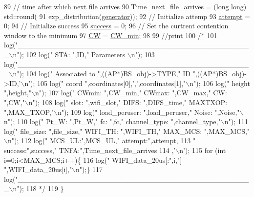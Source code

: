 \begin{DoxyCode}
89     \textcolor{comment}{// time after which next file arrives}
90     \hyperlink{classSTA_ad7653686912b61e311486017049c3612}{Time\_next\_file\_arrives} = (\textcolor{keywordtype}{long} long) std::round(
91             exp\_distribution(\hyperlink{classSTA_a6abca7e07713d8123e843efea3c87cd1}{generator}));
92     \textcolor{comment}{// Initialize attemp}
93     \hyperlink{classSTA_a4cfeac60ce7a13a4bbae68b756655dc9}{attempt} = 0;
94     \textcolor{comment}{// Initialize success}
95     \hyperlink{classSTA_a8f2d6be8326b3e46fbf1599040bff750}{success} = 0;
96     \textcolor{comment}{// Set the curtrent contention window to the minimum}
97     \hyperlink{classSTA_add0683c8927abd74b422d88844a00602}{CW} = \hyperlink{classSTA_ab466517298fbdaa0efd8532646930dfd}{CW\_min};
98     
99     \textcolor{comment}{//print}
100     \textcolor{comment}{/*}
101 \textcolor{comment}{    log("\_\_\_\_\_\_\_\_\_\_\_\_\_\_\_\_\_\_\_\_\_\_\_\_\_\_\_\_\_\_\_\_\_\_\_\_\_\_\_\_\_\_\_\_\_\_\(\backslash\)n");}
102 \textcolor{comment}{    log(" STA: ",ID," Parameters \(\backslash\)n");}
103 \textcolor{comment}{    log("\_\_\_\_\_\_\_\_\_\_\_\_\_\_\_\_\_\_\_\_\_\_\_\_\_\_\_\_\_\_\_\_\_\_\_\_\_\_\_\_\_\_\_\_\_\_\(\backslash\)n");}
104 \textcolor{comment}{    log(" Associated to ",((AP*)BS\_obj)->TYPE," ID ",((AP*)BS\_obj)->ID,'\(\backslash\)n');}
105 \textcolor{comment}{    log(" coord ",coordinates[0],',',coordinates[1],"\(\backslash\)n");}
106 \textcolor{comment}{    log(" height ",height,"\(\backslash\)n");}
107 \textcolor{comment}{    log(" CWmin: ",CW\_min," CWmax: ",CW\_max," CW: ",CW,"\(\backslash\)n");}
108 \textcolor{comment}{    log(" slot: ",wifi\_slot," DIFS: ",DIFS\_time," MAXTXOP: ",MAX\_TXOP,"\(\backslash\)n");}
109 \textcolor{comment}{    log(" load\_peruser: ",load\_peruser," Noise: ",Noise,"\(\backslash\)n");}
110 \textcolor{comment}{    log(" Pt\_W: ",Pt\_W," fc: ",fc," channel\_type: ",channel\_type,"\(\backslash\)n");}
111 \textcolor{comment}{    log(" file\_size: ",file\_size," WIFI\_TH: ",WIFI\_TH," MAX\_MCS: ",MAX\_MCS,"\(\backslash\)n");}
112 \textcolor{comment}{        log(" MCS\_UL:",MCS\_UL," attempt:",attempt,}
113 \textcolor{comment}{        " success:",success," TNFA:",Time\_next\_file\_arrives}
114 \textcolor{comment}{        ,'\(\backslash\)n');}
115 \textcolor{comment}{    for (int i=0;i<MAX\_MCS;i++)\{}
116 \textcolor{comment}{        log(" WIFI\_data\_20us[:",i,"] ",WIFI\_data\_20us[i],"\(\backslash\)n");\}    }
117 \textcolor{comment}{    log("\_\_\_\_\_\_\_\_\_\_\_\_\_\_\_\_\_\_\_\_\_\_\_\_\_\_\_\_\_\_\_\_\_\_\_\_\_\_\_\_\_\_\_\_\_\_\(\backslash\)n");}
118 \textcolor{comment}{    */}
119 \}
\end{DoxyCode}


